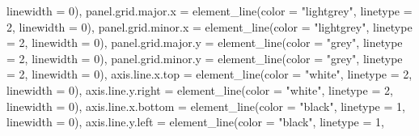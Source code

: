 \documentclass[
  letterpaper,
  DIV=11,
  numbers=noendperiod]{scrartcl}
\newenvironment{Shaded}{\begin{snugshade}}{\end{snugshade}}
\newcommand{\AttributeTok}[1]{\textcolor[rgb]{0.40,0.45,0.13}{#1}}
\newcommand{\DecValTok}[1]{\textcolor[rgb]{0.68,0.00,0.00}{#1}}
\newcommand{\FunctionTok}[1]{\textcolor[rgb]{0.28,0.35,0.67}{#1}}
\newcommand{\NormalTok}[1]{\textcolor[rgb]{0.00,0.23,0.31}{#1}}
\newcommand{\StringTok}[1]{\textcolor[rgb]{0.13,0.47,0.30}{#1}}
\begin{document}
\begin{Shaded}
\begin{Highlighting}[]
                                        \AttributeTok{linewidth =} \DecValTok{0}\NormalTok{),}
        \AttributeTok{panel.grid.major.x =} \FunctionTok{element\_line}\NormalTok{(}\AttributeTok{color =} \StringTok{"lightgrey"}\NormalTok{,}
                                          \AttributeTok{linetype =} \DecValTok{2}\NormalTok{,}
                                          \AttributeTok{linewidth =} \DecValTok{0}\NormalTok{),}
        \AttributeTok{panel.grid.minor.x =} \FunctionTok{element\_line}\NormalTok{(}\AttributeTok{color =} \StringTok{"lightgrey"}\NormalTok{,}
                                          \AttributeTok{linetype =} \DecValTok{2}\NormalTok{,}
                                          \AttributeTok{linewidth =} \DecValTok{0}\NormalTok{),}
        \AttributeTok{panel.grid.major.y =} \FunctionTok{element\_line}\NormalTok{(}\AttributeTok{color =} \StringTok{"grey"}\NormalTok{,}
                                          \AttributeTok{linetype =} \DecValTok{2}\NormalTok{,}
                                          \AttributeTok{linewidth =} \DecValTok{0}\NormalTok{),}
        \AttributeTok{panel.grid.minor.y =} \FunctionTok{element\_line}\NormalTok{(}\AttributeTok{color =} \StringTok{"grey"}\NormalTok{,}
                                          \AttributeTok{linetype =} \DecValTok{2}\NormalTok{,}
                                          \AttributeTok{linewidth =} \DecValTok{0}\NormalTok{),}
        \AttributeTok{axis.line.x.top =} \FunctionTok{element\_line}\NormalTok{(}\AttributeTok{color =} \StringTok{"white"}\NormalTok{,}
                                       \AttributeTok{linetype =} \DecValTok{2}\NormalTok{,}
                                       \AttributeTok{linewidth =} \DecValTok{0}\NormalTok{),}
        \AttributeTok{axis.line.y.right =} \FunctionTok{element\_line}\NormalTok{(}\AttributeTok{color =} \StringTok{"white"}\NormalTok{,}
                                         \AttributeTok{linetype =} \DecValTok{2}\NormalTok{,}
                                         \AttributeTok{linewidth =} \DecValTok{0}\NormalTok{),}
        \AttributeTok{axis.line.x.bottom =} \FunctionTok{element\_line}\NormalTok{(}\AttributeTok{color =} \StringTok{"black"}\NormalTok{,}
                                          \AttributeTok{linetype =} \DecValTok{1}\NormalTok{,}
                                          \AttributeTok{linewidth =} \DecValTok{0}\NormalTok{),}
        \AttributeTok{axis.line.y.left =} \FunctionTok{element\_line}\NormalTok{(}\AttributeTok{color =} \StringTok{"black"}\NormalTok{,}
                                        \AttributeTok{linetype =} \DecValTok{1}\NormalTok{,}

\end{Highlighting}
\end{Shaded}
\end{document}
